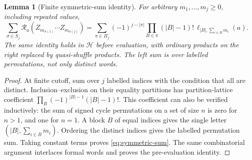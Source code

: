 \documentclass[11pt]{article}
\numberwithin{equation}{section}
\newtheorem{lemma}[theorem]{Lemma}
\theoremstyle{definition}
\newcommand{\R}{\mathcal R}
\newcommand{\Alg}{\mathscr H}
\begin{document}
\begin{lemma}[Finite symmetric-sum identity]\label{lem:sym-sum}
For arbitrary $m_1,\ldots,m_j\ge0$, including repeated values,
\begin{equation}\label{eq:symmetric-sum}
 \sum_{\sigma\in S_j}\R_a(Z_{m_{\sigma(1)}}\cdots Z_{m_{\sigma(j)}})
 =\sum_{\pi\in\Pi_j}(-1)^{j-|\pi|}
       \prod_{B\in\pi} (|B|-1)!\,
                  \ell_{|B|,\sum_{i\in B}m_i}(a).
\end{equation}
The same identity holds in $\Alg$ before evaluation, with ordinary
products on the right replaced by quasi-shuffle products. The left sum is
over labelled permutations, not only distinct words.
\end{lemma}
\begin{proof}
At finite cutoff, sum over $j$ labelled indices with the condition that
all are distinct. Inclusion--exclusion on their equality partitions has
partition-lattice coefficient
$\prod_B(-1)^{|B|-1}(|B|-1)!$. This coefficient can also be verified
inductively: the sum of signed cycle permutations on a set of size $n$
is zero for $n>1$, and one for $n=1$. A block $B$ of equal indices gives
the single letter $(|B|,\sum_{i\in B}m_i)$. Ordering the distinct indices
gives the labelled permutation sum. Taking constant terms proves
\eqref{eq:symmetric-sum}. The same combinatorial argument interlaces
formal words and proves the pre-evaluation identity.
\end{proof}
\end{document}
